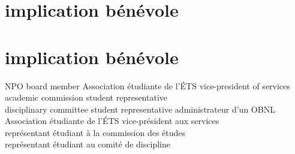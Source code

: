 \documentclass[print]{friggeri-cv}
\begin{document}
\ifdefined\isenglish\section{implication bénévole}\else\section{implication bénévole}\fi
\begin{entrylist}
  \ifdefined\isenglish
     {{\small NPO} board member} {Association étudiante de l'{\scriptsize ÉTS}} {vice-president of services\\ academic commission student representative \\ disciplinary committee student representative}
  \else
     {administrateur d'un {\small OBNL}} {Association étudiante de l'{\scriptsize ÉTS}} {vice-président aux services\\représentant étudiant à la commission des études\\représentant étudiant au comité de discipline}
  \fi
\end{entrylist}
\newpage
\end{document}
